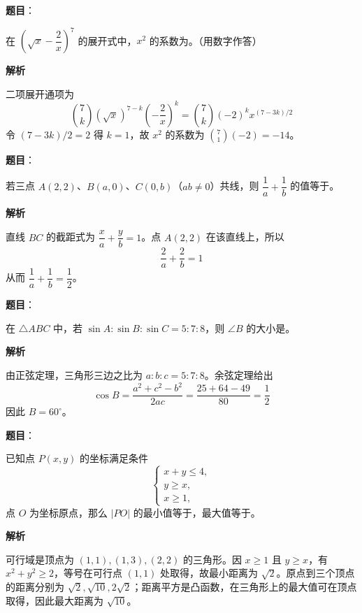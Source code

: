\begin{answer}

\textbf{题目}：

在 $\left(\sqrt{x}-\dfrac2x\right)^7$ 的展开式中，$x^2$ 的系数为\gkblank{}。（用数字作答）

\textbf{解析}

二项展开通项为
\nopagebreak[4]
\[
\binom7k(\sqrt{x})^{7-k}\left(-\frac2x\right)^k
=\binom7k(-2)^k x^{(7-3k)/2}
\]
令 $(7-3k)/2=2$ 得 $k=1$，故 $x^2$ 的系数为 $\binom71(-2)=-14$。


\end{answer}
\begin{answer}

\textbf{题目}：

若三点 $A(2,2)$、$B(a,0)$、$C(0,b)$（$ab\ne0$）共线，则 $\dfrac1a+\dfrac1b$ 的值等于\gkblank{}。

\textbf{解析}

直线 $BC$ 的截距式为 $\dfrac{x}{a}+\dfrac{y}{b}=1$。点 $A(2,2)$ 在该直线上，所以
\nopagebreak[4]
\[
\frac2a+\frac2b=1
\]
从而 $\dfrac1a+\dfrac1b=\dfrac12$。


\end{answer}
\begin{answer}

\textbf{题目}：

在 $\triangle ABC$ 中，若 $\sin A:\sin B:\sin C=5:7:8$，则 $\angle B$ 的大小是\gkblank{}。

\textbf{解析}

由正弦定理，三角形三边之比为 $a:b:c=5:7:8$。余弦定理给出
\nopagebreak[4]
\[
\cos B=\frac{a^2+c^2-b^2}{2ac}
=\frac{25+64-49}{80}=\frac12
\]
因此 $B=60^\circ$。


\end{answer}
\begin{answer}

\textbf{题目}：

已知点 $P(x,y)$ 的坐标满足条件
\nopagebreak[4]
\[
\begin{cases}
x+y\le 4,\\
y\ge x,\\
x\ge 1,
\end{cases}
\]
点 $O$ 为坐标原点，那么 $|PO|$ 的最小值等于\gkblank{}，最大值等于\gkblank{}。

\textbf{解析}

可行域是顶点为 $(1,1),(1,3),(2,2)$ 的三角形。因 $x\ge1$ 且 $y\ge x$，有 $x^2+y^2\ge2$，等号在可行点 $(1,1)$ 处取得，故最小距离为 $\sqrt2$。原点到三个顶点的距离分别为 $\sqrt2,\sqrt{10},2\sqrt2$；距离平方是凸函数，在三角形上的最大值可在顶点取得，因此最大距离为 $\sqrt{10}$。


\end{answer}
